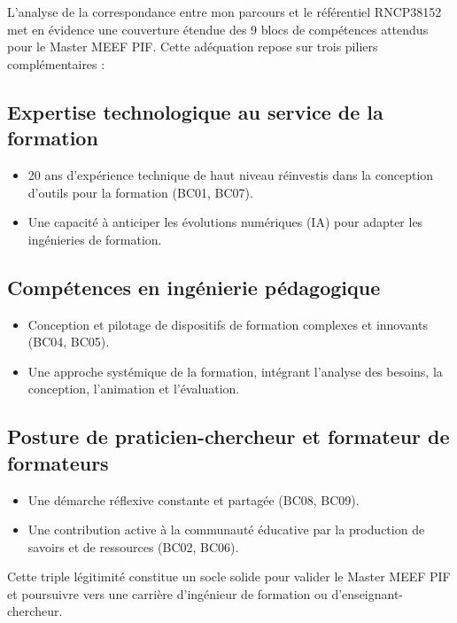L'analyse de la correspondance entre mon parcours et le référentiel RNCP38152 met en évidence une couverture étendue des 9 blocs de compétences attendus pour le Master MEEF PIF. Cette adéquation repose sur trois piliers complémentaires :

\subsection{Expertise technologique au service de la formation}

\begin{itemize}[leftmargin=*]
    \item 20 ans d'expérience technique de haut niveau réinvestis dans la conception d'outils pour la formation (BC01, BC07).
    \item Une capacité à anticiper les évolutions numériques (IA) pour adapter les ingénieries de formation.
\end{itemize}

\subsection{Compétences en ingénierie pédagogique}

\begin{itemize}[leftmargin=*]
    \item Conception et pilotage de dispositifs de formation complexes et innovants (BC04, BC05).
    \item Une approche systémique de la formation, intégrant l'analyse des besoins, la conception, l'animation et l'évaluation.
\end{itemize}

\subsection{Posture de praticien-chercheur et formateur de formateurs}

\begin{itemize}[leftmargin=*]
    \item Une démarche réflexive constante et partagée (BC08, BC09).
    \item Une contribution active à la communauté éducative par la production de savoirs et de ressources (BC02, BC06).
\end{itemize}

\vspace{1cm}

Cette triple légitimité constitue un socle solide pour valider le Master MEEF PIF et poursuivre vers une carrière d'ingénieur de formation ou d'enseignant-chercheur.
